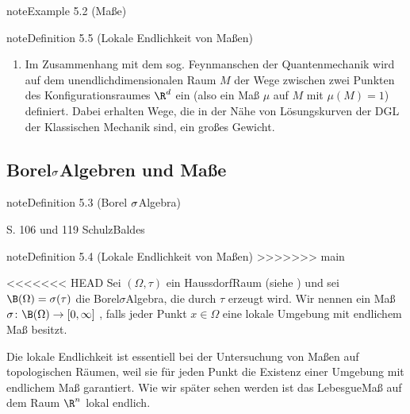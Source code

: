 \documentclass[letterpaper,10pt,english]{jupyterBook}
\begin{document}
\begin{sphinxadmonition}{note}{Example 5.2 (Maße)}
\begin{sphinxadmonition}{note}{Definition 5.5 (Lokale Endlichkeit von Maßen)}
\begin{enumerate}
\item {} 
\sphinxAtStartPar
Im Zusammenhang mit dem sog. Feynmanschen  der Quantenmechanik wird auf dem unendlich\sphinxhyphen{}dimensionalen Raum \(M\) der Wege zwischen zwei Punkten des Konfigurationsraumes \(\R^d\) ein  (also ein Maß \(\mu\) auf \(M\) mit \(\mu (M)=1\)) definiert. Dabei erhalten Wege, die in der Nähe von Lösungskurven der DGL der Klassischen Mechanik sind, ein großes Gewicht.

\end{enumerate}
\end{sphinxadmonition}


\subsection{Borel\sphinxhyphen{}\protect\(\sigma\protect\)\sphinxhyphen{}Algebren und \sphinxhyphen{}Maße}
\label{\detokenize{masstheorie/masstheorie:borel-sigma-algebren-und-masze}}\label{masstheorie/masstheorie:definition-3}
\begin{sphinxadmonition}{note}{Definition 5.3 (Borel \protect\(\sigma\protect\)\sphinxhyphen{}Algebra)}



\sphinxAtStartPar
S. 106 und 119 Schulz\sphinxhyphen{}Baldes
\end{sphinxadmonition}
\label{masstheorie/masstheorie:definition-4}
\begin{sphinxadmonition}{note}{Definition 5.4 (Lokale Endlichkeit von Maßen)}
>>>>>>> main



\sphinxAtStartPar
<<<<<<< HEAD
Sei \((\Omega, \tau)\) ein Haussdorf\sphinxhyphen{}Raum (siehe {\hyperref[\detokenize{manifolds/manifolds_prelim:def:hausdorffraum}]{}}) und sei \(\B(\Omega) = \sigma(\tau)\) die Borel\sphinxhyphen{}\(\sigma\)\sphinxhyphen{}Algebra, die durch \(\tau\) erzeugt wird.
Wir nennen ein Maß \(\sigma \colon \B(\Omega) \rightarrow [0, \infty]\) , falls jeder Punkt \(x \in \Omega\) eine lokale Umgebung mit endlichem Maß besitzt.
\end{sphinxadmonition}

\sphinxAtStartPar
Die lokale Endlichkeit ist essentiell bei der Untersuchung von Maßen auf topologischen Räumen, weil sie für jeden Punkt die Existenz einer Umgebung mit endlichem Maß garantiert.
Wie wir später sehen werden ist das Lebesgue\sphinxhyphen{}Maß auf dem Raum \(\R^n\) lokal endlich.


\end{sphinxadmonition}
\end{document}
